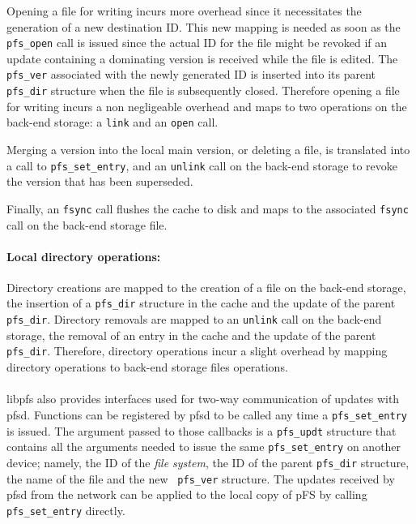 Opening a file for writing incurs more overhead since it necessitates
the generation of a new destination ID. This new mapping is needed as
soon as the {\tt pfs\_open} call is issued since the actual ID for the
file might be revoked if an update containing a dominating version is
received while the file is edited. The {\tt pfs\_ver} associated with
the newly generated ID is inserted into its parent {\tt pfs\_dir}
structure when the file is subsequently closed. Therefore opening a
file for writing incurs a non negligeable overhead and maps to two
operations on the back-end storage: a {\tt link} and an {\tt open}
call.

Merging a version into the local main version, or deleting a file, is
translated into a call to {\tt pfs\_set\_entry}, and an {\tt unlink}
call on the back-end storage to revoke the version that has been
superseded.

Finally, an {\tt fsync} call flushes the cache to disk and maps to the
associated {\tt fsync} call on the back-end storage file.

\paragraph{Local directory operations:}
Directory creations are mapped to the creation of a file on the
back-end storage, the insertion of a {\tt pfs\_dir} structure in the
cache and the update of the parent {\tt pfs\_dir}. Directory removals
are mapped to an {\tt unlink} call on the back-end storage, the
removal of an entry in the cache and the update of the parent {\tt
  pfs\_dir}. Therefore, directory operations incur a slight overhead
by mapping directory operations to back-end storage files operations.

\paragraph{}
libpfs also provides interfaces used for two-way communication of
updates with pfsd. Functions can be registered by pfsd to be called
any time a {\tt pfs\_set\_entry} is issued. The argument passed to
those callbacks is a {\tt pfs\_updt} structure that contains all the
arguments needed to issue the same {\tt pfs\_set\_entry} on another
device; namely, the ID of the \emph{file system}, the ID of the parent
{\tt pfs\_dir} structure, the name of the file and the new {\tt
  pfs\_ver} structure. The updates received by pfsd from the network
can be applied to the local copy of pFS by calling {\tt
  pfs\_set\_entry} directly.

